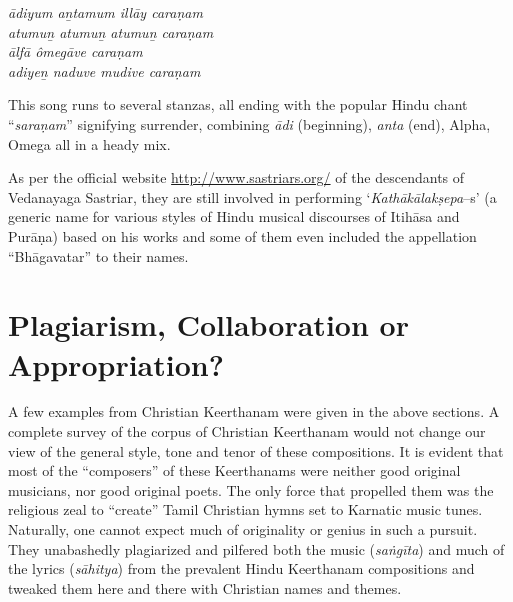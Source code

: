 \begin{myquote}
\textit{ādiyum aṉtamum illāy caraṇam\\ atumuṉ atumuṉ atumuṉ caraṇam\\ ālfā ômegāve caraṇam\\ adiyeṉ naduve mudive caraṇam}
\end{myquote}

\begin{myquote}
\end{myquote}

This song runs to several stanzas, all ending with the popular Hindu chant “\textit{saraṇam}” signifying surrender, combining \textit{ādi} (beginning), \textit{anta} (end), Alpha, Omega all in a heady mix.

As per the official website \url{http://www.sastriars.org/} of the descendants of Vedanayaga Sastriar, they are still involved in performing ‘\textit{Kathākālakṣepa}–s’ (a generic name for various styles of Hindu musical discourses of Itihāsa and Purāṇa) based on his works and some of them even included the appellation “Bhāgavatar” to their names.


\section*{Plagiarism, Collaboration or Appropriation?}

A few examples from Christian Keerthanam were given in the above sections. A complete survey of the corpus of Christian Keerthanam would not change our view of the general style, tone and tenor of these compositions. It is evident that most of the “composers” of these Keerthanams were neither good original musicians, nor good original poets. The only force that propelled them was the religious zeal to “create” Tamil Christian hymns set to Karnatic music tunes. Naturally, one cannot expect much of originality or genius in such a pursuit. They unabashedly plagiarized and pilfered both the music (\textit{saṅgīta}) and much of the lyrics (\textit{sāhitya}) from the prevalent Hindu Keerthanam compositions and tweaked them here and there with Christian names and themes.

